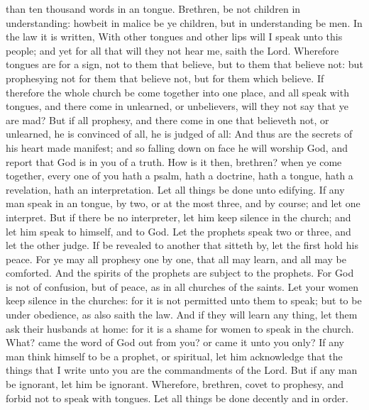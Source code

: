 {than ten
thousand
words
in
an
{}
tongue.
Brethren,
be
not
children in
understanding:
howbeit in
malice be ye
children,
but in
understanding
be
men.
In the
law it is
written,
With
{} other
tongues
and
other
lips will I
speak unto
this
people;
and yet for all
that will
they
not
hear
me,
saith the
Lord.
Wherefore
tongues
are
for a
sign,
not to
them that
believe,
but to
them that believe
not:
but
prophesying
{}
not for
them that believe
not,
but for
them which
believe.
If
therefore the
whole
church be come
together
into one
place,
and
all
speak with
tongues,
and there come
in
{}
unlearned,
or
unbelievers, will
they
not
say
that ye are
mad?
But
if
all
prophesy,
and there come
in
one that believeth
not,
or
{}
unlearned, he is
convinced
of
all, he is
judged
of
all:
And
thus
are the
secrets of
his
heart
made
manifest;
and
so falling
down
on
{}
face he will
worship
God, and
report
that
God
is
in
you of a
truth.
How is
it
then,
brethren?
when ye come
together, every
one of
you
hath a
psalm,
hath a
doctrine,
hath a
tongue,
hath a
revelation,
hath an
interpretation.
Let all
things be
done
unto
edifying.
If any
man
speak
in
an
{}
tongue,
{}
by
two,
or at the
most
{}
three,
and
{} by
course;
and
let
one
interpret.
But
if there
be
no
interpreter, let him keep
silence
in the
church;
and let him
speak to
himself,
and to
God.
Let the
prophets
speak
two
or
three,
and
let the
other
judge.
If
{} be
revealed to
another that sitteth
by,
let the
first hold his
peace.
For ye
may
all
prophesy
one
by
one,
that
all may
learn,
and
all may be
comforted.
And the
spirits of the
prophets are
subject to the
prophets.
For
God
is
not
{} of
confusion,
but of
peace,
as
in
all
churches of the
saints.
Let
your
women keep
silence
in the
churches:
for it
is
not
permitted unto
them to
speak;
but
{} to be under
obedience,
as
also
saith the
law.
And
if they
will
learn any
thing, let them
ask
their
husbands
at
home:
for it
is a
shame for
women to
speak
in the
church.
What?
came the
word of
God
out
from
you?
or came
it
unto
you
only?
If any
man think
himself to
be a
prophet,
or
spiritual, let him
acknowledge that the
things
that I
write unto
you
are the
commandments of the
Lord.
But
if any
man be
ignorant, let him be
ignorant.
Wherefore,
brethren,
covet to
prophesy,
and
forbid
not to
speak with
tongues.
Let all
things be
done
decently
and
in
order.

}
